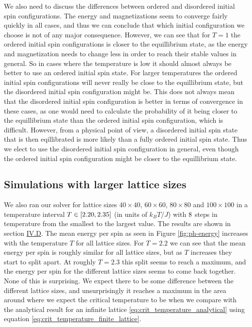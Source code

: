 \documentclass[reprint,english,notitlepage]{revtex4-1}  %
\begin{document}
We also need to discuss the differences between ordered and disordered initial spin configurations. The energy and magnetizations seem to converge fairly quickly in all cases, and thus we can conclude that which initial configuration we choose is not of any major consequence. However, we can see that for $T=1$ the ordered initial spin configurations is closer to the equillibrium state, as the energy and magnetization needs to change less in order to reach their stable values in general. So in cases where the temperature is low it should almost always be better to use an ordered initial spin state. For larger temperatures the ordered initial spin configurations will never really be close to the equillibrium state, but the disordered initial spin configuration might be. This does not always mean that the disordered initial spin configuration is better in terms of convergence in these cases, as one would need to calculate the probability of it being closer to the equillibrium state than the ordered initial spin configuration, which is difficult. However, from a physical point of view, a disordered initial spin state that is then eqillibrated is more likely than a fully ordered initial spin state. Thus we elect to use the disordered initial spin configuration in general, even though the ordered initial spin configuration might be closer to the equillibrium state.



\subsection{Simulations with larger lattice sizes} \label{sec:V:D}

We also ran our solver for lattice sizes $40\times 40$, $60\times 60$, $80 \times 80$ and $100 \times 100$ in a temperature interval $T\in [2.20,2.35]$ (in units of $k_B T/J$) with $8$ steps in temperature from the smallest to the largest value. The results are shown in section \hyperref[sec:IV.D]{IV.D}. The mean energy per spin as seen in Figure \ref{fig:ph-energy} increases with the temperature $T$ for all lattice sizes. For $T=2.2$ we can see that the mean energy per spin is roughly similar for all lattice sizes, but as $T$ increases they start to split apart. At roughly $T=2.3$ this split seems to reach a maximum, and the energy per spin for the different lattice sizes seems to come back together. None of this is surprising. We expect there to be some difference between the different lattice sizes, and unsurprisingly it reaches a maximum in the area around where we expect the critical temperature to be when we compare with the analytical result for an infinite lattice \eqref{eq:crit_temperature_analytical} using equation \eqref{eq:crit_temperature_finite_lattice}.
\end{document}
